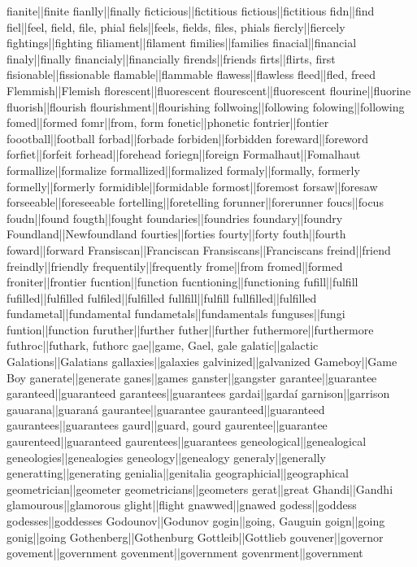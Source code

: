 fianite||finite
fianlly||finally
ficticious||fictitious
fictious||fictitious
fidn||find
fiel||feel, field, file, phial
fiels||feels, fields, files, phials
fiercly||fiercely
fightings||fighting
filiament||filament
fimilies||families
finacial||financial
finaly||finally
financialy||financially
firends||friends
firts||flirts, first
fisionable||fissionable
flamable||flammable
flawess||flawless
fleed||fled, freed
Flemmish||Flemish
florescent||fluorescent
flourescent||fluorescent
flourine||fluorine
fluorish||flourish
flourishment||flourishing
follwoing||following
folowing||following
fomed||formed
fomr||from, form
fonetic||phonetic
fontrier||fontier
foootball||football
forbad||forbade
forbiden||forbidden
foreward||foreword
forfiet||forfeit
forhead||forehead
foriegn||foreign
Formalhaut||Fomalhaut
formallize||formalize
formallized||formalized
formaly||formally, formerly
formelly||formerly
formidible||formidable
formost||foremost
forsaw||foresaw
forseeable||foreseeable
fortelling||foretelling
forunner||forerunner
foucs||focus
foudn||found
fougth||fought
foundaries||foundries
foundary||foundry
Foundland||Newfoundland
fourties||forties
fourty||forty
fouth||fourth
foward||forward
Fransiscan||Franciscan
Fransiscans||Franciscans
freind||friend
freindly||friendly
frequentily||frequently
frome||from
fromed||formed
froniter||frontier
fucntion||function
fucntioning||functioning
fufill||fulfill
fufilled||fulfilled
fulfiled||fulfilled
fullfill||fulfill
fullfilled||fulfilled
fundametal||fundamental
fundametals||fundamentals
funguses||fungi
funtion||function
furuther||further
futher||further
futhermore||furthermore
futhroc||futhark, futhorc
gae||game, Gael, gale
galatic||galactic
Galations||Galatians
gallaxies||galaxies
galvinized||galvanized
Gameboy||Game Boy
ganerate||generate
ganes||games
ganster||gangster
garantee||guarantee
garanteed||guaranteed
garantees||guarantees
gardai||gardaí
garnison||garrison
gauarana||guaraná
gaurantee||guarantee
gauranteed||guaranteed
gaurantees||guarantees
gaurd||guard, gourd
gaurentee||guarantee
gaurenteed||guaranteed
gaurentees||guarantees
geneological||genealogical
geneologies||genealogies
geneology||genealogy
generaly||generally
generatting||generating
genialia||genitalia
geographicial||geographical
geometrician||geometer
geometricians||geometers
gerat||great
Ghandi||Gandhi
glamourous||glamorous
glight||flight
gnawwed||gnawed
godess||goddess
godesses||goddesses
Godounov||Godunov
gogin||going, Gauguin
goign||going
gonig||going
Gothenberg||Gothenburg
Gottleib||Gottlieb
gouvener||governor
govement||government
govenment||government
govenrment||government
